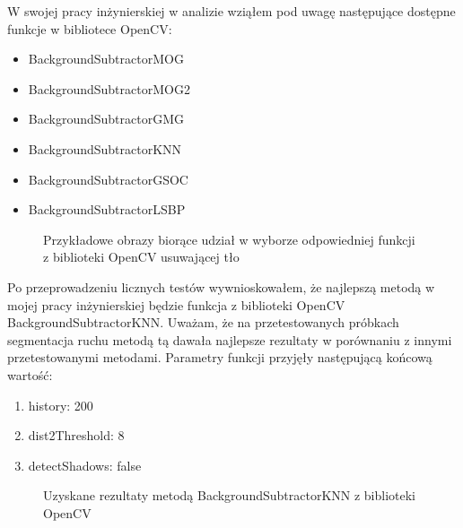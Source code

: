 \documentclass[a4paper,12pt,twoside,openany]{report}
\newcommand{\ImgPath}{.}
\begin{document}
W swojej pracy inżynierskiej w analizie wziąłem pod uwagę następujące dostępne funkcje w bibliotece OpenCV:

\begin{itemize} 
	\item BackgroundSubtractorMOG
	\item BackgroundSubtractorMOG2
	\item BackgroundSubtractorGMG
	\item BackgroundSubtractorKNN
	\item BackgroundSubtractorGSOC
	\item BackgroundSubtractorLSBP
\end{itemize} 

\begin{figure}[H]
	\centering
	\caption{Przykładowe obrazy biorące udział w wyborze odpowiedniej funkcji z biblioteki OpenCV usuwającej tło}
\end{figure}

Po przeprowadzeniu licznych testów wywnioskowałem, że najlepszą metodą w mojej pracy inżynierskiej będzie funkcja z biblioteki OpenCV BackgroundSubtractorKNN. Uważam, że na przetestowanych próbkach segmentacja ruchu metodą tą dawała najlepsze rezultaty w porównaniu z innymi przetestowanymi metodami. Parametry funkcji przyjęły następującą końcową wartość:
\begin{enumerate}
	\item history: 200
	\item dist2Threshold: 8
	\item detectShadows: false
\end{enumerate}

\begin{figure}[H]
	\centering
	\caption{Uzyskane rezultaty metodą BackgroundSubtractorKNN z biblioteki OpenCV}
\end{figure}
\end{document}
